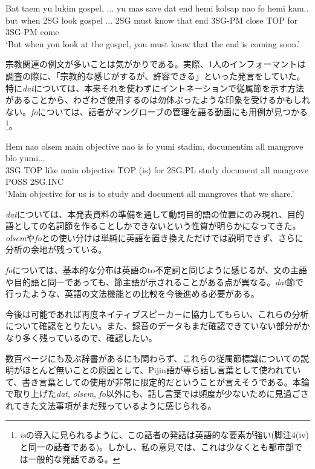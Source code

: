 \documentclass[11pt,a4paper]{jsarticle}
\begin{document}
\begin{exe}
\ex\label{bokushi}
\gll Bat taem yu lukim gospel, ... yu mas save dat end hemi kolsap nao fo hemi kam..\\
but when 2SG look gospel ... 2SG must know that end 3SG-PM close TOP for 3SG-PM come\\
\glt `But when you look at the gospel, you must know that the end is coming soon.'
\end{exe}

宗教関連の例文が多いことは気がかりである。実際、1人のインフォーマントは調査の際に、「宗教的な感じがするが、許容できる」といった発言をしていた。特に\textit{dat}については、本来それを使わずにイントネーションで従属節を示す方法があることから、わざわざ使用するのは勿体ぶったような印象を受けるかもしれない。\textit{fo}については、話者がマングローブの管理を語る動画\citep{manguru}にも用例が見つかる\footnote{\textit{is}の導入に見られるように、この話者の発話は英語的な要素が強い(脚注4(iv)と同一の話者である)。しかし、私の意見では、これは少なくとも都市部では一般的な発話である。}。

\begin{exe}
\ex\label{manguru1}
\gll Hem nao olsem main objective nao is fo yumi stadim, documentim all mangrove blo yumi...\\
3SG TOP like main objective TOP (is) for 2SG.PL study document all mangrove POSS 2SG.INC\\
\glt `Main objective for us is to study and document all mangroves that we share.'\citep[20分4秒]{manguru}
\end{exe}

\textit{dat}については、本発表資料の準備を通して動詞目的語の位置にのみ現れ、目的語としての名詞節を作ることしかできないという性質が明らかになってきた。\textit{olsem}や\textit{fo}との使い分けは単純に英語を置き換えただけでは説明できず、さらに分析の余地が残っている。

\textit{fo}については、基本的な分布は英語のto不定詞と同じように感じるが、文の主語や目的語と同一であっても、節主語が示されることがある点が異なる。\textit{dat}節で行ったような、英語の文法機能との比較を今後進める必要がある。

今後は可能であれば再度ネイティブスピーカーに協力してもらい、これらの分析について確認をとりたい。また、録音のデータもまだ確認できていない部分がかなり多く残っているので、確認したい。


数百ページにも及ぶ辞書\cite{dictionary}があるにも関わらず、これらの従属節標識についての説明がほとんど無いことの原因として、Pijin語が専ら話し言葉として使われていて、書き言葉としての使用が非常に限定的だということが言えそうである。本論で取り上げた\textit{dat}, \textit{olsem}, \textit{fo}以外にも、話し言葉では頻度が少ないために見過ごされてきた文法事項がまだ残っているように感じられる。


\end{document}
